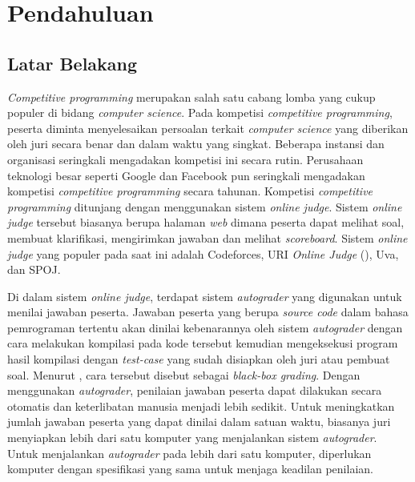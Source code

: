\chapter{Pendahuluan}

\section{Latar Belakang}

\par \textit{Competitive programming} merupakan salah satu cabang lomba yang cukup populer di bidang \textit{computer science}. Pada kompetisi \textit{competitive programming}, peserta diminta menyelesaikan persoalan terkait \textit{computer science} yang diberikan oleh juri secara benar dan dalam waktu yang singkat. Beberapa instansi dan organisasi seringkali mengadakan kompetisi ini secara rutin. Perusahaan teknologi besar seperti Google dan Facebook pun seringkali mengadakan kompetisi \textit{competitive programming} secara tahunan. Kompetisi \textit{competitive programming} ditunjang dengan menggunakan sistem \textit{online judge}. Sistem \textit{online judge} tersebut biasanya berupa halaman \textit{web} dimana peserta dapat melihat soal, membuat klarifikasi, mengirimkan jawaban dan melihat \textit{scoreboard}. Sistem \textit{online judge} yang populer pada saat ini adalah Codeforces, URI \textit{Online Judge} (\cite{uriojpaper}), Uva, dan SPOJ.

\par Di dalam sistem \textit{online judge}, terdapat sistem \textit{autograder} yang digunakan untuk menilai jawaban peserta. Jawaban peserta yang berupa \textit{source code} dalam bahasa pemrograman tertentu akan dinilai kebenarannya oleh sistem \textit{autograder} dengan cara melakukan kompilasi pada kode tersebut kemudian mengeksekusi program hasil kompilasi dengan \textit{test-case} yang sudah disiapkan oleh juri atau pembuat soal. Menurut \cite{jordanioi}, cara tersebut disebut sebagai \textit{black-box grading}. Dengan menggunakan \textit{autograder}, penilaian jawaban peserta dapat dilakukan secara otomatis dan keterlibatan manusia menjadi lebih sedikit. Untuk meningkatkan jumlah jawaban peserta yang dapat dinilai dalam satuan waktu, biasanya juri menyiapkan lebih dari satu komputer yang menjalankan sistem \textit{autograder}. Untuk menjalankan \textit{autograder} pada lebih dari satu komputer, diperlukan komputer dengan spesifikasi yang sama untuk menjaga keadilan penilaian.

